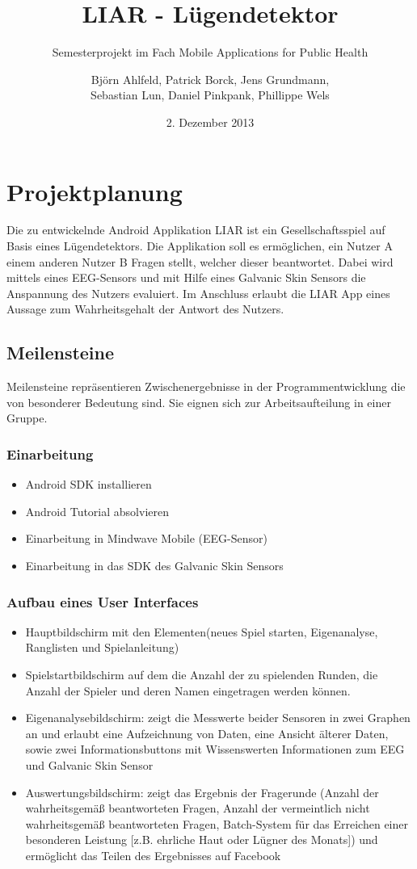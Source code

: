 \documentclass[10pt, a4paper, oneside, titlepage]{scrartcl} %
\date{2. Dezember 2013}
\author{Björn Ahlfeld, Patrick Borck, Jens Grundmann,\\ Sebastian Lun, Daniel Pinkpank, Phillippe Wels}
\title{LIAR - Lügendetektor}
\subtitle{Semesterprojekt im Fach Mobile Applications for Public Health}
\begin{document}
   	\maketitle
   	\thispagestyle{empty}
	\tableofcontents
	\listoffigures
	\listoftables
	
   	\newpage   	
   	\section{Projektplanung}
   	Die zu entwickelnde Android Applikation LIAR ist ein Gesellschaftsspiel auf Basis eines Lügendetektors. Die Applikation soll es ermöglichen, ein Nutzer A einem anderen Nutzer B Fragen stellt, welcher dieser beantwortet. Dabei wird mittels eines EEG-Sensors und mit Hilfe eines Galvanic Skin Sensors die Anspannung des Nutzers evaluiert. Im Anschluss erlaubt die LIAR App eines Aussage zum Wahrheitsgehalt der Antwort des Nutzers.
   	
   	\newpage
   	\subsection{Meilensteine}
	Meilensteine repräsentieren Zwischenergebnisse in der Programmentwicklung die von besonderer Bedeutung sind. Sie eignen sich zur Arbeitsaufteilung in einer Gruppe.
	\subsubsection{Einarbeitung}
	\begin{itemize}
	\item{}Android SDK installieren
	\item{}Android Tutorial absolvieren
	\item{}Einarbeitung in Mindwave Mobile (EEG-Sensor)
	\item{}Einarbeitung in das SDK des Galvanic Skin Sensors
	\end{itemize}	  	
	\subsubsection{Aufbau eines User Interfaces}
	\begin{itemize}
	\item{}Hauptbildschirm mit den Elementen(neues Spiel starten, Eigenanalyse, Ranglisten und Spielanleitung)
	\item{}Spielstartbildschirm auf dem die Anzahl der zu spielenden Runden, die Anzahl der Spieler und deren Namen eingetragen werden können.
	\item{}Eigenanalysebildschirm: zeigt die Messwerte beider Sensoren in zwei Graphen an und erlaubt eine Aufzeichnung von Daten, eine Ansicht älterer Daten, sowie zwei Informationsbuttons mit Wissenswerten Informationen zum EEG und Galvanic Skin Sensor
	\item{}Auswertungsbildschirm: zeigt das Ergebnis der Fragerunde (Anzahl der wahrheitsgemäß beantworteten Fragen, Anzahl der vermeintlich nicht wahrheitsgemäß beantworteten Fragen, Batch-System für das Erreichen einer besonderen Leistung [z.B. ehrliche Haut oder Lügner des Monats]) und ermöglicht das Teilen des Ergebnisses auf Facebook
	\end{itemize}
\end{document}
